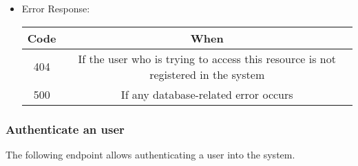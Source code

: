 \begin{itemize}
    \item Error Response:
    \begin{table}[!h]
    \centering
    \begin{tabular}{|c|c|}
    \hline
    \multicolumn{1}{|c|}{\textbf{Code}} & \multicolumn{1}{c|}{\textbf{When}} \\ \hline
    404 & If the user who is trying to access this resource is not registered in the system \\\hline
    500 & If any database-related error occurs \\\hline
    \end{tabular}
    \end{table}

\end{itemize}


\newpage
\subsubsection*{Authenticate an user}

The following endpoint allows authenticating a user into the system.

